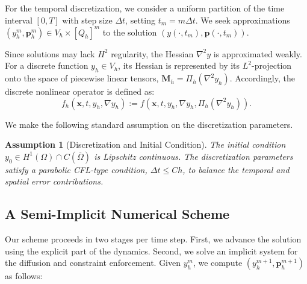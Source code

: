 \documentclass[pdflatex,sn-mathphys-num]{sn-jnl}%
\theoremstyle{thmstyleone}%
\newtheorem{assum}{Assumption}[section]
\numberwithin{equation}{section}
\begin{document}
For the temporal discretization, we consider a uniform partition of the time interval $[0,T]$ with step size $\Delta t$, setting $t_m = m \Delta t$. We seek approximations $(y_h^m, \bm{p}_h^m) \in V_h \times [Q_h]^m$ to the solution $(y(\cdot, t_m), \bm{p}(\cdot, t_m))$.

Since solutions may lack $H^2$ regularity, the Hessian $\nabla^2 y$ is approximated weakly. For a discrete function $y_h \in V_h$, its Hessian is represented by its $L^2$-projection onto the space of piecewise linear tensors, $\bm{M}_h = \Pi_h(\nabla^2 y_h)$. Accordingly, the discrete nonlinear operator is defined as:
$$f_h(\bm{x}, t, y_h, \nabla y_h) := f(\bm{x}, t, y_h, \nabla y_h, \Pi_h(\nabla^2 y_h)).$$

We make the following standard assumption on the discretization parameters.

\begin{assum}[Discretization and Initial Condition]
\label{ass:initial_imp}
The initial condition $y_0 \in H^1(\Omega) \cap C(\overline{\Omega})$ is Lipschitz continuous. The discretization parameters satisfy a parabolic CFL-type condition, $\Delta t \leq C h$, to balance the temporal and spatial error contributions.
\end{assum}

\subsection{A Semi-Implicit Numerical Scheme}
\label{subsect:scheme}

Our scheme proceeds in two stages per time step. First, we advance the solution using the explicit part of the dynamics. Second, we solve an implicit system for the diffusion and constraint enforcement. Given $y_h^m$, we compute $(y_h^{m+1}, \bm{p}_h^{m+1})$ as follows:
\end{document}
